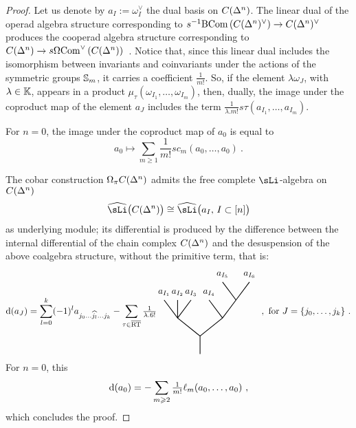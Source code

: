 \documentclass[twoside, 10pt]{amsart}
\newtheorem{definition}[lemma]{Definition}
\begin{document}
\begin{proof}
Let us denote by $a_I:=\omega_I^\vee$ the dual basis on $C(\mathrm{\Delta}^{n})$. The linear dual of the operad algebra structure corresponding to $s^{-1} \mathrm{B} \mathrm{Com}\left(C(\mathrm{\Delta}^{n})^\vee \right)\to C(\mathrm{\Delta}^{n})^\vee$ produces the cooperad algebra structure corresponding to $C(\mathrm{\Delta}^{n})\to s \Omega \mathrm{Com}^\vee\left(C(\mathrm{\Delta}^{n})\right)$\ . Notice that, since this linear dual includes the isomorphism between invariants and coinvariants under the actions of the symmetric groups $\mathbb{S}_m$, it carries a coefficient ${\textstyle \frac{1}{m!}}$. So, if the element $\lambda \omega_J$, with $\lambda \in \mathbb{K}$, appears in  a product $\mu_\tau\left(
\omega_{I_1}, \ldots, \omega_{I_m}\right)$, then, dually, the image under 
the coproduct map of the element $a_J$ includes the term ${\textstyle \frac{1}{\lambda.m!}} s\tau(  
a_{I_1}, \ldots, a_{I_m})$. 

For $n=0$, the image under the coproduct map of $a_0$ is equal to 
\[
a_0\mapsto \sum_{m\geqslant 1} {\textstyle \frac{1}{m!}} s c_m(a_0, \ldots, a_0)\ .
\]

The cobar construction $\Omega_\pi C(\mathrm{\Delta}^{n})$ admits the free complete $\sLi$-algebra on $C(\mathrm{\Delta}^{n})$
\[\widehat{\sLi}\big(C(\De{n})\big)\cong 
\widehat{\sLi}\big(a_I,\, I\subset[n]\big)
\]
 as underlying module; its differential is produced by the 
 difference between the internal differential of the chain complex $C(\mathrm{\Delta}^{n})$ and the 
 desuspension of the above coalgebra structure, without the primitive term, that is:
\[\d(a_J)= 
\sum_{l=0}^{k} (-1)^{l} a_{j_0\ldots \widehat{j_l} \ldots j_k}
-\sum_{\tau \in \overline{\RT}} {\textstyle\frac{1}{\lambda.6!}}\!\!\!
\vcenter{\hbox{
\begin{tikzpicture}[yscale=0.7,xscale=0.7]

\draw[thick] (-2,2)--(-1.25,1) -- (0,0) -- (0,-1);
\draw[thick] (-1.25,2) -- (-1.25,1); 
\draw[thick] (-0.5,2) -- (-1.25,1); 
\draw[thick] (0,0) -- (1.25,1) -- (2,2)--(2.75,3); 
\draw[thick] (0.5,2) -- (1.25,1); 
\draw[thick] (1.25,3) -- (2,2); 

\node at (-2,2.4) {$a_{I_1}$};
\node at (-1.25,2.4) {$a_{I_2}$};
\node at (-0.5,2.4) {$a_{I_3}$};
\node at (0.5,2.4) {$a_{I_4}$};
\node at (1.25,3.4) {$a_{I_5}$};
\node at (2.75,3.4) {$a_{I_6}$};
\end{tikzpicture}}}\ ,\ 
\text{for} \ J=\{j_0, \ldots, j_k\}\ .
\]
For $n=0$, this 
\[\mathrm{d}(a_0)=-\sum_{m\geqslant 2} {\textstyle \frac{1}{m!}}\ell_m(a_0, \ldots, a_0)\ ,\]
which concludes the proof. 
\end{proof}

%
\end{document}
